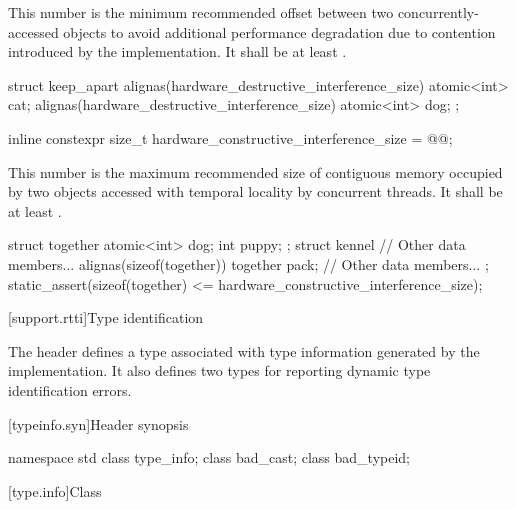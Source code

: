 \pnum
This number is the minimum recommended offset
between two concurrently-accessed objects
to avoid additional performance degradation due to contention
introduced by the implementation.
It shall be at least .

%
\begin{example}
\begin{codeblock}
struct keep_apart {
  alignas(hardware_destructive_interference_size) atomic<int> cat;
  alignas(hardware_destructive_interference_size) atomic<int> dog;
};
\end{codeblock}
\end{example}

%
\begin{itemdecl}
inline constexpr size_t hardware_constructive_interference_size = @\impdef{}@;
\end{itemdecl}

\pnum
This number is the maximum recommended size of contiguous memory
occupied by two objects accessed with temporal locality by concurrent threads.
It shall be at least .

%
\begin{example}
\begin{codeblock}
struct together {
  atomic<int> dog;
  int puppy;
};
struct kennel {
  // Other data members...
  alignas(sizeof(together)) together pack;
  // Other data members...
};
static_assert(sizeof(together) <= hardware_constructive_interference_size);
\end{codeblock}
\end{example}

[support.rtti]{Type identification}

\pnum
The header  defines a
type associated with type information generated by the implementation.
It also defines two types for reporting dynamic type identification errors.

[typeinfo.syn]{Header  synopsis}

%
%
%
\begin{codeblock}
namespace std {
  class type_info;
  class bad_cast;
  class bad_typeid;
}
\end{codeblock}

[type.info]{Class }

